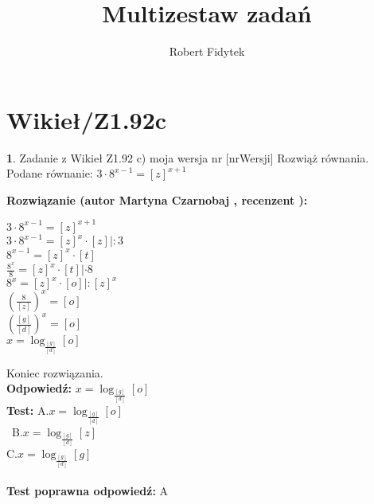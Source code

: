 \documentclass[12pt, a4paper]{article}
\title{Multizestaw zadań}
\author{Robert Fidytek}
\date{}
\theoremstyle{definition} %
\newtheorem{zad}{}
\newcommand{\kategoria}[1]{\section{#1}} %
\newcommand{\zadStart}[1]{\begin{zad}#1\newline} %
\newcommand{\zadStop}{\end{zad}}   %
\newcommand{\rozwStart}[2]{\noindent \textbf{Rozwiązanie (autor #1 , recenzent #2): }\newline} %
\newcommand{\rozwStop}{\newline}                                            %
\newcommand{\odpStart}{\noindent \textbf{Odpowiedź:}\newline}    %
\newcommand{\odpStop}{\newline}                                             %
\newcommand{\testStart}{\noindent \textbf{Test:}\newline} %
\newcommand{\testStop}{\newline} %
\newcommand{\kluczStart}{\noindent \textbf{Test poprawna odpowiedź:}\newline} %
\newcommand{\kluczStop}{\newline} %
\begin{document}
\maketitle

\kategoria{Wikieł/Z1.92c}
\zadStart{Zadanie z Wikieł Z1.92 c) moja wersja nr [nrWersji]}
Rozwiąż równania.\\
Podane równanie: $ 3 \cdot 8^{x - 1} = [z]^{x + 1} $
\zadStop
\rozwStart{Martyna Czarnobaj}{}
\begin{center}
	$ 3 \cdot 8^{x - 1} = [z]^{x + 1} $\\
	$ 3 \cdot 8^{x - 1} = [z]^{x} \cdot [z] |:3 $\\
	$ 8^{x - 1} = [z]^{x} \cdot [t] $\\
	$ \frac{8^{x}}{8} = [z]^{x} \cdot [t] | \cdot 8 $\\
	$ 8^{x} = [z]^{x} \cdot [o] |:[z]^{x} $\\
	$ (\frac{8}{[z]})^{x} = [o] $\\
	$ (\frac{[g]}{[d]})^{x} = [o] $\\
	$ x = \log_{\frac{[g]}{[d]}} [o] $\\
\end{center}
Koniec rozwiązania.\\
\rozwStop
\odpStart
 $ x = \log_{\frac{[g]}{[d]}} [o] $\\
\odpStop
\testStart
A.$ x = \log_{\frac{[g]}{[d]}} [o] $\\\
B.$ x = \log_{\frac{[g]}{[d]}} [z] $\\
C.$ x = \log_{\frac{[g]}{[d]}} [g] $\\\\
\testStop
\kluczStart
A
\kluczStop
\end{document}
